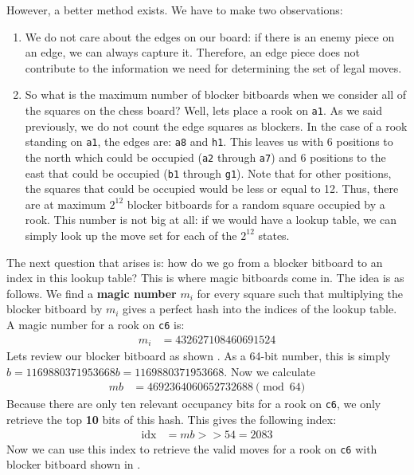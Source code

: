 However, a better method exists.
We have to make two observations:
%
\begin{enumerate}
	\item We do not care about the edges on our board: if there is an enemy piece on an edge, we can always capture it. 
	Therefore, an edge piece does not contribute to the information we need for determining the set of legal moves.
	
	\item So what is the maximum number of blocker bitboards when we consider all of the squares on the chess board?
	Well, lets place a rook on \texttt{a1}. 
	As we said previously, we do not count the edge squares as blockers. 
	In the case of a rook standing on \texttt{a1}, the edges are: \texttt{a8} and \texttt{h1}. 
	This leaves us with 6 positions to the north which could be occupied (\texttt{a2} through \texttt{a7}) and 6 positions to the east that could be occupied (\texttt{b1} through \texttt{g1}).
	Note that for other positions, the squares that could be occupied would be less or equal to 12.
	Thus, there are at maximum $2^{12}$ blocker bitboards for a random square occupied by a rook. 
	This number is not big at all: if we would have a lookup table, we can simply look up the move set for each of the $2^{12}$ states.
\end{enumerate}
%
The next question that arises is: how do we go from a blocker bitboard to an index in this lookup table? 
This is where magic bitboards come in. The idea is as follows. 
We find a \textbf{magic number} $m_i$ for every square such that multiplying the blocker bitboard by $m_i$ gives a perfect hash into the indices of the lookup table.
A magic number for a rook on \texttt{c6} is:
%
\begin{align*}
m_i &= 432627108460691524
\end{align*}
%
Lets review our blocker bitboard as shown . 
As a 64-bit number, this is simply $b = 1169880371953668b=1169880371953668$.
Now we calculate
%
\begin{align*}
mb &= 4692364060652732688 \pmod{64}
\end{align*}
%
Because there are only ten relevant occupancy bits for a rook on \texttt{c6}, we only retrieve the top \textbf{10} bits of this hash. This gives the following index:
%
\begin{align*}
\text{idx} &= mb >> 54 = 2083
\end{align*}
%
Now we can use this index to retrieve the valid moves for a rook on \texttt{c6} with blocker bitboard shown in .
